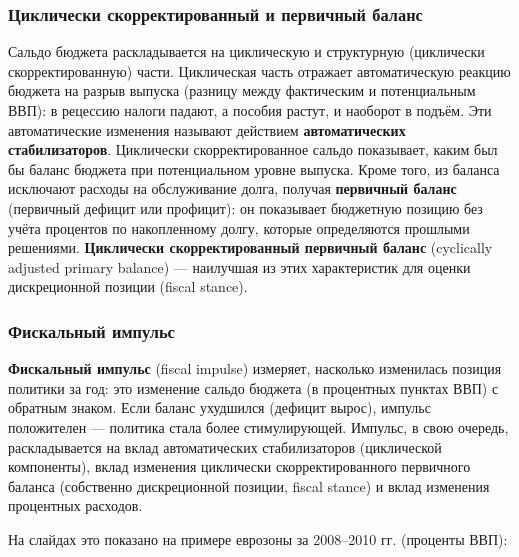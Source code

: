 \documentclass[11pt,a4paper]{article}
\begin{document}
\subsubsection{Циклически скорректированный и первичный баланс}

Сальдо бюджета раскладывается на циклическую и структурную (циклически скорректированную) части. Циклическая часть отражает автоматическую реакцию бюджета на разрыв выпуска (разницу между фактическим и потенциальным ВВП): в рецессию налоги падают, а пособия растут, и наоборот в подъём. Эти автоматические изменения называют действием \textbf{автоматических стабилизаторов}. Циклически скорректированное сальдо показывает, каким был бы баланс бюджета при потенциальном уровне выпуска. Кроме того, из баланса исключают расходы на обслуживание долга, получая \textbf{первичный баланс} (первичный дефицит или профицит): он показывает бюджетную позицию без учёта процентов по накопленному долгу, которые определяются прошлыми решениями. \textbf{Циклически скорректированный первичный баланс} (cyclically adjusted primary balance) --- наилучшая из этих характеристик для оценки дискреционной позиции (fiscal stance).

\subsubsection{Фискальный импульс}

\textbf{Фискальный импульс} (fiscal impulse) измеряет, насколько изменилась позиция политики за год: это изменение сальдо бюджета (в процентных пунктах ВВП) с обратным знаком. Если баланс ухудшился (дефицит вырос), импульс положителен --- политика стала более стимулирующей. Импульс, в свою очередь, раскладывается на вклад автоматических стабилизаторов (циклической компоненты), вклад изменения циклически скорректированного первичного баланса (собственно дискреционной позиции, fiscal stance) и вклад изменения процентных расходов.

На слайдах это показано на примере еврозоны за 2008--2010 гг. (проценты ВВП):
\end{document}
